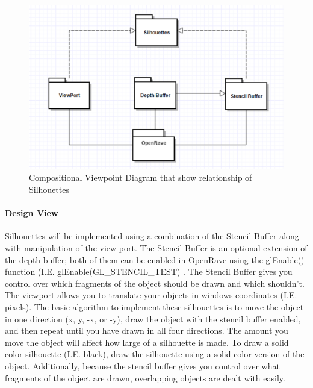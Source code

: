 \begin{flushleft}
\begin{figure} [H]
  \includegraphics[scale=0.9]{designdoc_v1/Silhouettes_composition.eps}
  \caption
{ \newline \hspace{\linewidth}
Compositional Viewpoint Diagram that show relationship of Silhouettes}
  \label{fig:Silhouettes_composition}
\end{figure}

\paragraph{Design View}
Silhouettes will be implemented using a combination of the Stencil Buffer along with manipulation of the view port.
The Stencil Buffer is an optional extension of the depth buffer; both of them can be enabled in OpenRave using the glEnable() function (I.E. glEnable(GL\_STENCIL\_TEST) \cite{depthstencils}.
The Stencil Buffer gives you control over which fragments of the object should be drawn and which shouldn't.
The viewport allows you to translate your objects in windows coordinates (I.E. pixels).
The basic algorithm to implement these silhouettes is to move the object in one direction (x, y, -x, or -y), draw the object with the stencil buffer enabled, and then repeat until you have drawn in all four directions.
The amount you move the object will affect how large of a silhouette is made.
To draw a solid color silhouette (I.E. black), draw the silhouette using a solid color version of the object.
Additionally, because the stencil buffer gives you control over what fragments of the object are drawn, overlapping objects are dealt with easily.

\newpage


\end{flushleft}
